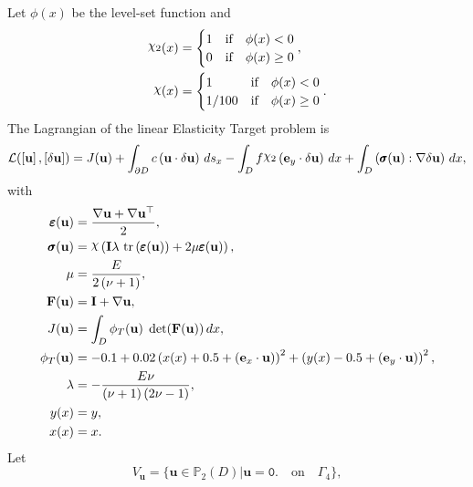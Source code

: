 \documentclass[preview]{standalone}
\let\oldcdot\cdot
\let\cdot\oldcdot
\begin{document}
Let $\phi(x)$ be the level-set function and
 \begin{align*}\raisebox{\depth}{$\chi_2$}(x) &= \begin{cases} 1 & \mbox{if}\quad \phi(x) < 0 \\ 0 & \mbox{if}\quad \phi(x)  \ge 0 \end{cases},\\
\raisebox{\depth}{$\chi$}(x) &= \begin{cases} 1 & \mbox{if}\quad \phi(x) < 0 \\ 1/100 & \mbox{if}\quad \phi(x)  \ge 0 \end{cases}.\end{align*}
The Lagrangian of the linear Elasticity Target problem is
\begin{dmath*}
\mathcal L(\left[ {\mathbf{ u }}\right],\left[ {\delta\mathbf{  u }}\right]) = J({\mathbf{ u }}) +  \int_{\partial D} c \left( {\mathbf{ u }} \cdot {\delta\mathbf{  u }} \right) \,ds_x -  \int_{D} f \raisebox{\depth}{$\chi_2$} \left( \mathbf e_y \cdot {\delta\mathbf{  u }} \right) \,dx +  \int_{D} \left( \pmb \sigma({\mathbf{ u }}) \mathrel{:}  \nabla {\delta\mathbf{  u }}  \right) \,dx , 
\end{dmath*}
with 
\begin{align*}
\pmb \varepsilon({\mathbf{ u }}) &= \frac{ \nabla {\mathbf{ u }}  +   \nabla {\mathbf{ u }} ^\top }{2},\\
\pmb \sigma({\mathbf{ u }}) &= \raisebox{\depth}{$\chi$} \left(\mathbf{I} \lambda  \,\operatorname{tr}\left(\pmb \varepsilon({\mathbf{ u }})\right)  + 2 \mu \pmb \varepsilon({\mathbf{ u }})\right),\\
\mu &= \frac{E}{2 \left(\nu + 1\right)},\\
\mathbf F({\mathbf{ u }}) &= \mathbf{I} +  \nabla {\mathbf{ u }} ,\\
J({\mathbf{ u }}) &=  \int_{D} \phi_{T}({\mathbf{ u }})  \;\operatorname{det}(\mathbf F({\mathbf{ u }}))  \,dx,\\
\phi_{T}({\mathbf{ u }}) &= -0.1 + 0.02 \left(x(x) + 0.5 + \left( \mathbf e_x \cdot {\mathbf{ u }} \right)\right)^{2} + \left(y(x) - 0.5 + \left( \mathbf e_y \cdot {\mathbf{ u }} \right)\right)^{2},\\
\lambda &= - \frac{E \nu}{\left(\nu + 1\right) \left(2 \nu - 1\right)},\\
y(x) &= y,\\
x(x) &= x.
 \end{align*}
Let
\begin{equation*}
V_{{\mathbf{ u }}} = \{ {\mathbf{ u }} \in \mathbb P_{2}(D)| {\mathbf{ u }} = \mathtt{\text{0.}}  \quad \text{{on}} \quad\Gamma_{4} \},\end{equation*}
\end{document}
